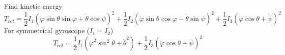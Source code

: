 Find kinetic energy
$$T_{rot} = \frac{1}{2} I_1 \left( \dot{\varphi}\sin \theta \sin \varphi+\dot{\theta}\cos \psi \right)^2 + \frac{1}{2} I_2 \left( \dot{\varphi}\sin \theta \cos \varphi-\dot{\theta}\sin \psi \right)^2 
+ \frac{1}{2} I_3 \left( \dot{\varphi} \cos \theta+\dot{\psi} \right)^2 $$
For symmetrical gyroscope ($I_1=I_2$)
$$T_{rot} = \frac{1}{2} I_1 \left( \dot{\varphi}^2 \sin^2 \theta + \dot{\theta}^2  \right) +  \frac{1}{2} I_3 \left( \dot{\varphi} \cos \theta + \dot{\psi}  \right)^2$$